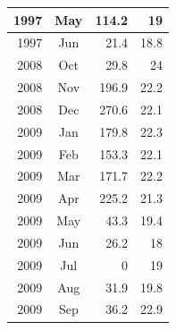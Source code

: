 \documentclass[11pt]{article}
\begin{document}
\begin{table}[H]
{\begin{tabular}{|r|c|r|r|}
1997 & May & 114.2 & 19 \\ \hline
1997 & Jun & 21.4 & 18.8 \\ \hline
2008 & Oct & 29.8 & 24 \\ \hline
2008 & Nov & 196.9 & 22.2 \\ \hline
2008 & Dec & 270.6 & 22.1 \\ \hline
2009 & Jan & 179.8 & 22.3 \\ \hline
2009 & Feb & 153.3 & 22.1 \\ \hline
2009 & Mar & 171.7 & 22.2 \\ \hline
2009 & Apr & 225.2 & 21.3 \\ \hline
2009 & May & 43.3 & 19.4 \\ \hline
2009 & Jun & 26.2 & 18 \\ \hline
2009 & Jul & 0 & 19 \\ \hline
2009 & Aug & 31.9 & 19.8 \\ \hline
2009 & Sep & 36.2 & 22.9 \\ \hline
\end{tabular}%
}
\end{table}
\end{document}
